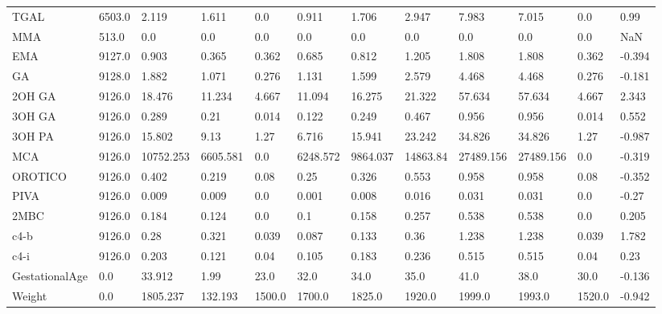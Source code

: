 \begin{tabular}{llllllllllll}
TGAL & 6503.0 & 2.119 & 1.611 & 0.0 & 0.911 & 1.706 & 2.947 & 7.983 & 7.015 & 0.0 & 0.99 \\
MMA & 513.0 & 0.0 & 0.0 & 0.0 & 0.0 & 0.0 & 0.0 & 0.0 & 0.0 & 0.0 & NaN \\
EMA & 9127.0 & 0.903 & 0.365 & 0.362 & 0.685 & 0.812 & 1.205 & 1.808 & 1.808 & 0.362 & -0.394 \\
GA & 9128.0 & 1.882 & 1.071 & 0.276 & 1.131 & 1.599 & 2.579 & 4.468 & 4.468 & 0.276 & -0.181 \\
2OH GA & 9126.0 & 18.476 & 11.234 & 4.667 & 11.094 & 16.275 & 21.322 & 57.634 & 57.634 & 4.667 & 2.343 \\
3OH GA & 9126.0 & 0.289 & 0.21 & 0.014 & 0.122 & 0.249 & 0.467 & 0.956 & 0.956 & 0.014 & 0.552 \\
3OH PA & 9126.0 & 15.802 & 9.13 & 1.27 & 6.716 & 15.941 & 23.242 & 34.826 & 34.826 & 1.27 & -0.987 \\
MCA & 9126.0 & 10752.253 & 6605.581 & 0.0 & 6248.572 & 9864.037 & 14863.84 & 27489.156 & 27489.156 & 0.0 & -0.319 \\
OROTICO & 9126.0 & 0.402 & 0.219 & 0.08 & 0.25 & 0.326 & 0.553 & 0.958 & 0.958 & 0.08 & -0.352 \\
PIVA & 9126.0 & 0.009 & 0.009 & 0.0 & 0.001 & 0.008 & 0.016 & 0.031 & 0.031 & 0.0 & -0.27 \\
2MBC & 9126.0 & 0.184 & 0.124 & 0.0 & 0.1 & 0.158 & 0.257 & 0.538 & 0.538 & 0.0 & 0.205 \\
c4-b & 9126.0 & 0.28 & 0.321 & 0.039 & 0.087 & 0.133 & 0.36 & 1.238 & 1.238 & 0.039 & 1.782 \\
c4-i & 9126.0 & 0.203 & 0.121 & 0.04 & 0.105 & 0.183 & 0.236 & 0.515 & 0.515 & 0.04 & 0.23 \\
GestationalAge & 0.0 & 33.912 & 1.99 & 23.0 & 32.0 & 34.0 & 35.0 & 41.0 & 38.0 & 30.0 & -0.136 \\
Weight & 0.0 & 1805.237 & 132.193 & 1500.0 & 1700.0 & 1825.0 & 1920.0 & 1999.0 & 1993.0 & 1520.0 & -0.942 \\
\bottomrule
\end{tabular}
